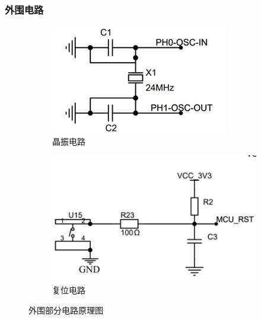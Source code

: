 \documentclass{beamer}
\begin{document}
		
		\begin{frame}
			\frametitle{外围电路}
			
			\begin{figure}[t]
				\centering
				\captionsetup{font=scriptsize} 
				\begin{subfigure}{0.45\textwidth}
					\centering
					\includegraphics[width=1\linewidth]{img/chapter4/jingzhen}
					\caption{晶振电路}
				\end{subfigure}
				\hfill
				\begin{subfigure}{0.45\textwidth}
					\centering
					\includegraphics[width=1\linewidth]{img/chapter4/fuwei}
					\caption{复位电路}
				\end{subfigure}
				
				\vspace{-5pt}
				\captionsetup{font=scriptsize} 
				\caption{外围部分电路原理图}
			\end{figure}
			
		\end{frame}
	
\end{document}
